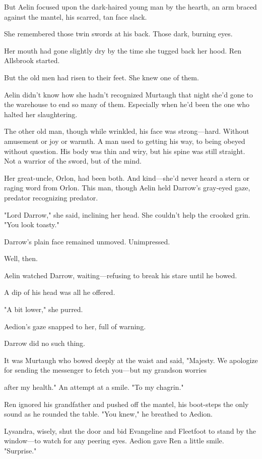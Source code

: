 But Aelin focused upon the dark-haired young man by the hearth, an arm braced against the mantel, his scarred, tan face slack.

She remembered those twin swords at his back. Those dark, burning eyes.

Her mouth had gone slightly dry by the time she tugged back her hood. Ren Allsbrook started.

But the old men had risen to their feet. She knew one of them.

Aelin didn't know how she hadn't recognized Murtaugh that night she'd gone to the warehouse to end so many of them. Especially when he'd been the one who halted her slaughtering.

The other old man, though  while wrinkled, his face was strong---hard. Without amusement or joy or warmth. A man used to getting his way, to being obeyed without question. His body was thin and wiry, but his spine was still straight. Not a warrior of the sword, but of the mind.

Her great-uncle, Orlon, had been both. And kind---she'd never heard a stern or raging word from Orlon. This man, though  Aelin held Darrow's gray-eyed gaze, predator recognizing predator.

"Lord Darrow," she said, inclining her head. She couldn't help the crooked grin. "You look toasty."

Darrow's plain face remained unmoved. Unimpressed.

Well, then.

Aelin watched Darrow, waiting---refusing to break his stare until he bowed.

A dip of his head was all he offered.

"A bit lower," she purred.

Aedion's gaze snapped to her, full of warning.

Darrow did no such thing.

It was Murtaugh who bowed deeply at the waist and said, "Majesty. We apologize for sending the messenger to fetch you---but my grandson worries

after my health." An attempt at a smile. "To my chagrin."

Ren ignored his grandfather and pushed off the mantel, his boot-steps the only sound as he rounded the table. "You knew," he breathed to Aedion.

Lysandra, wisely, shut the door and bid Evangeline and Fleetfoot to stand by the window---to watch for any peering eyes. Aedion gave Ren a little smile. "Surprise."

